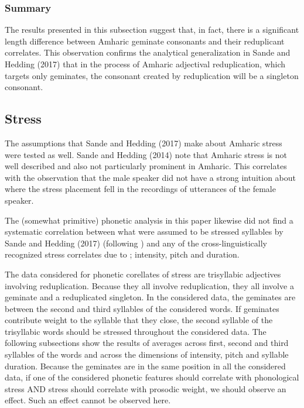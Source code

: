 \documentclass[12pt]{article}
\begin{document}
\subsubsection{Summary}

The results presented in this subsection suggest that, in fact, there is a significant length difference between Amharic geminate consonants and their reduplicant correlates. This observation confirms the analytical generalization in Sande and Hedding (2017) that in the process of Amharic adjectival reduplication, which targets only geminates, the consonant created by reduplication will be a singleton consonant.



\subsection{Stress}

The assumptions that Sande and Hedding (2017) make about Amharic stress were tested as well. Sande and Hedding (2014) note that Amharic stress is not well described and also not particularly prominent in Amharic. This correlates with the observation that the male speaker did not have a strong intuition about where the stress placement fell in the recordings of utterances of the female speaker.

The (somewhat primitive) phonetic analysis in this paper likewise did not find a systematic correlation between what were assumed to be stressed syllables by Sande and Hedding (2017) (following \cite{leslau-amharic-grammar}) and any of the cross-linguistically recognized stress correlates due to \cite{fox2002}; intensity, pitch and duration.

The data considered for phonetic corellates of stress are trisyllabic adjectives involving reduplication. Because they all involve reduplication, they all involve a geminate and a reduplicated singleton. In the considered data, the geminates are between the second and third syllables of the considered words. If geminates contribute weight to the syllable that they close, the second syllable of the trisyllabic words should be stressed throughout the considered data. The following subsections show the results of averages across first, second and third syllables of the words and across the dimensions of intensity, pitch and syllable duration.%
Because the geminates are in the same position in all the considered data, if one of the considered phonetic features should correlate with phonological stress AND stress should correlate with prosodic weight, we should observe an effect. Such an effect cannot be observed here.
\end{document}
